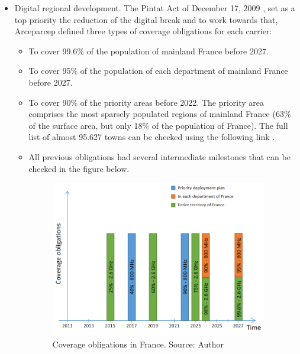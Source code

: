 \begin{itemize}
	\item Digital regional development. The Pintat Act of December 17, 2009 \cite{2-23}, set as a top priority the reduction of the digital break and to work towards that, Arceparcep defined three types of coverage obligations for each carrier:\par

\begin{itemize}
	\item To cover 99.6$\%$  of the population of mainland France before 2027.\par

	\item To cover 95$\%$  of the population of each department of mainland France before 2027.\par

	\item To cover 90$\%$  of the priority areas before 2022. The priority area comprises the most sparsely populated regions of mainland France (63$\%$  of the surface area, but only 18$\%$  of the population of France). The full list of almost 95.627 towns can be checked using the following link \cite{2-24}.\par

	\item All previous obligations had several intermediate milestones that can be checked in the figure below.




\begin{figure}[H]
	\begin{Center}
		\includegraphics[width=0.95\textwidth]{./media/image12.png}
		\caption{Coverage obligations in France. Source: Author}
	\end{Center}
\end{figure}



\end{itemize}
\end{itemize}
